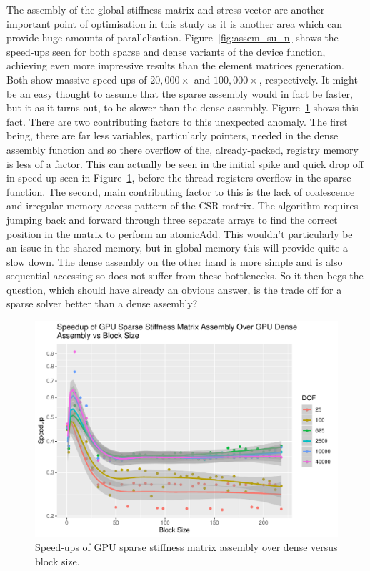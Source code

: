 The assembly of the global stiffness matrix and stress vector are another important point of optimisation in this study as it is another area which can provide huge amounts of parallelisation. Figure~\ref{fig:assem_su_n} shows the speed-ups seen for both sparse and dense variants of the device function, achieving even more impressive results than the element matrices generation. Both show massive speed-ups of $20,000\times$ and $100,000\times$, respectively. It might be an easy thought to assume that the sparse assembly would in fact be faster, but it as it turns out, to be slower than the dense assembly. Figure~\ref{fig:sparse_dense_assem} shows this fact. There are two contributing factors to this unexpected anomaly. The first being, there are far less variables, particularly pointers, needed in the dense assembly function and so there overflow of the, already-packed, registry memory is less of a factor. This can actually be seen in the initial spike and quick drop off in speed-up seen in Figure~\ref{fig:sparse_dense_assem}, before the thread registers overflow in the sparse function. The second, main contributing factor to this is the lack of coalescence and irregular memory access pattern of the CSR matrix. The algorithm requires jumping back and forward through three separate arrays to find the correct position in the matrix to perform an atomicAdd. This wouldn't particularly be an issue in the shared memory, but in global memory this will provide quite a slow down. The dense assembly on the other hand is more simple and is also sequential accessing so does not suffer from these bottlenecks. So it then begs the question, which should have already an obvious answer, is the trade off for a sparse solver better than a dense assembly?

\begin{figure}
	\centering
	\includegraphics[width=0.55\linewidth]{Plots/assem_dev_gpu_sparse_dense_speedup_vs_b}
	\caption{Speed-ups of GPU sparse stiffness matrix assembly over dense versus block size.}
	\label{fig:sparse_dense_assem}
\end{figure}

